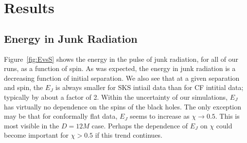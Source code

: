 





\section{Results}
\label{sec:Results}




\subsection{Energy in Junk Radiation}

Figure~\ref{fig:EvsS} shows the energy in the pulse of junk radiation,
for all of our runs, as a function of spin. As was expected, the
energy in junk radiation is a decreasing function of initial
separation. We also see that at a given separation and spin, the $E_J$
is always smaller for SKS intiail data than for CF intitial data;
typically by about a factor of 2. Within
the uncertainty of our simulations, $E_J$ has virtually no dependence
on the spins of the black holes. The only exception may be that for
conformally flat data, $E_J$ seems to increase as $\chi\rightarrow
0.5$. This is most visible in the $D=12M$ case. Perhaps the dependence
of $E_J$ on $\chi$ could become important for $\chi > 0.5$ if this
trend continues.

